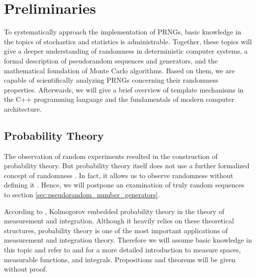 \documentclass{stdlocal}
\begin{document}
\section{Preliminaries} %
\label{sub:preliminaries}
  To systematically approach the implementation of PRNGs, basic knowledge in the topics of stochastics and statistics is administrable.
  Together, these topics will give a deeper understanding of randomness in deterministic computer systems, a formal description of pseudorandom sequences and generators, and the mathematical foundation of Monte Carlo algorithms.
  Based on them, we are capable of scientifically analyzing PRNGs concerning their randomness properties.
  Afterwards, we will give a brief overview of template mechanisms in the C++ programming language and the fundamentals of modern computer architecture.

  \subsection{Probability Theory} %
  \label{sub:stochastics}
    The observation of random experiments resulted in the construction of probability theory.
    But probability theory itself does not use a further formalized concept of randomness \autocite{schmidt2009}.
    In fact, it allows us to observe randomness without defining it \autocite{volchan2002}.
    Hence, we will postpone an examination of truly random sequences to section \ref{sec:pseudorandom_number_generators}.

    According to \textcite{schmidt2009}, Kolmogorov embedded probability theory in the theory of measurement and integration.
    Although it heavily relies on these theoretical structures, probability theory is one of the most important applications of measurement and integration theory.
    Therefore we will assume basic knowledge in this topic and refer to \textcite{schmidt2009} and \textcite{elstrodt2011} for a more detailed introduction to measure spaces, measurable functions, and integrals.
    Propositions and theorems will be given without proof.
\end{document}
